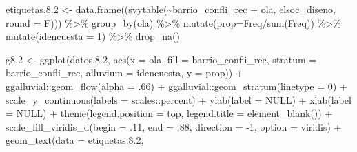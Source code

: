 \documentclass[
  12pt,
]{book}
\newenvironment{Shaded}{\begin{snugshade}}{\end{snugshade}}
\newcommand{\AttributeTok}[1]{\textcolor[rgb]{0.77,0.63,0.00}{#1}}
\newcommand{\ConstantTok}[1]{\textcolor[rgb]{0.00,0.00,0.00}{#1}}
\newcommand{\DecValTok}[1]{\textcolor[rgb]{0.00,0.00,0.81}{#1}}
\newcommand{\FloatTok}[1]{\textcolor[rgb]{0.00,0.00,0.81}{#1}}
\newcommand{\FunctionTok}[1]{\textcolor[rgb]{0.00,0.00,0.00}{#1}}
\newcommand{\NormalTok}[1]{#1}
\newcommand{\OtherTok}[1]{\textcolor[rgb]{0.56,0.35,0.01}{#1}}
\newcommand{\SpecialCharTok}[1]{\textcolor[rgb]{0.00,0.00,0.00}{#1}}
\newcommand{\StringTok}[1]{\textcolor[rgb]{0.31,0.60,0.02}{#1}}
\begin{document}
\begin{Shaded}
\begin{Highlighting}[]
\NormalTok{etiquetas.}\FloatTok{8.2} \OtherTok{\textless{}{-}} \FunctionTok{data.frame}\NormalTok{((}\FunctionTok{svytable}\NormalTok{(}\SpecialCharTok{\textasciitilde{}}\NormalTok{barrio\_confli\_rec }\SpecialCharTok{+}\NormalTok{ ola, elsoc\_diseno, }\AttributeTok{round =}\NormalTok{ F))) }\SpecialCharTok{\%\textgreater{}\%} 
  \FunctionTok{group\_by}\NormalTok{(ola) }\SpecialCharTok{\%\textgreater{}\%} \FunctionTok{mutate}\NormalTok{(}\AttributeTok{prop=}\NormalTok{Freq}\SpecialCharTok{/}\FunctionTok{sum}\NormalTok{(Freq)) }\SpecialCharTok{\%\textgreater{}\%} \FunctionTok{mutate}\NormalTok{(}\AttributeTok{idencuesta =} \DecValTok{1}\NormalTok{) }\SpecialCharTok{\%\textgreater{}\%} 
  \FunctionTok{drop\_na}\NormalTok{()}

\NormalTok{g8}\FloatTok{.2} \OtherTok{\textless{}{-}} 
  \FunctionTok{ggplot}\NormalTok{(datos.}\FloatTok{8.2}\NormalTok{, }\FunctionTok{aes}\NormalTok{(}\AttributeTok{x =}\NormalTok{ ola, }\AttributeTok{fill =}\NormalTok{ barrio\_confli\_rec, }\AttributeTok{stratum =}\NormalTok{ barrio\_confli\_rec, }
                           \AttributeTok{alluvium =}\NormalTok{ idencuesta, }\AttributeTok{y =}\NormalTok{ prop)) }\SpecialCharTok{+}
\NormalTok{  ggalluvial}\SpecialCharTok{::}\FunctionTok{geom\_flow}\NormalTok{(}\AttributeTok{alpha =}\NormalTok{ .}\DecValTok{66}\NormalTok{) }\SpecialCharTok{+} 
\NormalTok{  ggalluvial}\SpecialCharTok{::}\FunctionTok{geom\_stratum}\NormalTok{(}\AttributeTok{linetype =} \DecValTok{0}\NormalTok{) }\SpecialCharTok{+}
  \FunctionTok{scale\_y\_continuous}\NormalTok{(}\AttributeTok{labels =}\NormalTok{ scales}\SpecialCharTok{::}\NormalTok{percent) }\SpecialCharTok{+} 
  \FunctionTok{ylab}\NormalTok{(}\AttributeTok{label =} \ConstantTok{NULL}\NormalTok{) }\SpecialCharTok{+}
  \FunctionTok{xlab}\NormalTok{(}\AttributeTok{label =} \ConstantTok{NULL}\NormalTok{) }\SpecialCharTok{+} 
  \FunctionTok{theme}\NormalTok{(}\AttributeTok{legend.position =} \StringTok{\textquotesingle{}top\textquotesingle{}}\NormalTok{,}
        \AttributeTok{legend.title =} \FunctionTok{element\_blank}\NormalTok{()) }\SpecialCharTok{+}
  \FunctionTok{scale\_fill\_viridis\_d}\NormalTok{(}\AttributeTok{begin =}\NormalTok{ .}\DecValTok{11}\NormalTok{, }\AttributeTok{end =}\NormalTok{ .}\DecValTok{88}\NormalTok{, }\AttributeTok{direction =} \SpecialCharTok{{-}}\DecValTok{1}\NormalTok{, }\AttributeTok{option =} \StringTok{\textquotesingle{}viridis\textquotesingle{}}\NormalTok{) }\SpecialCharTok{+}
  \FunctionTok{geom\_text}\NormalTok{(}\AttributeTok{data =}\NormalTok{ etiquetas.}\FloatTok{8.2}\NormalTok{, }

\end{Highlighting}
\end{Shaded}
\end{document}

